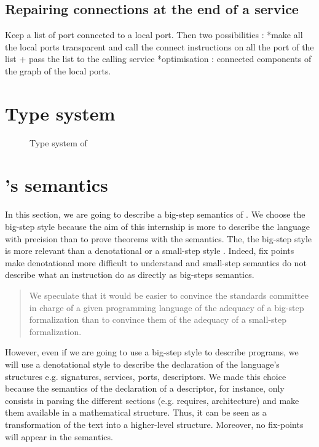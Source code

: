 \section{Repairing connections at the end of a service}
Keep a list of port connected to a local port. Then two possibilities : 
*make all the local ports transparent and call the connect instructions on all the port of the list + pass the list to the calling service
*optimisation : connected components of the graph of the local ports.




\chapter{Type system}


\begin{figure}[ht!]
\caption{Type system of \compo{}}


\label{fig:type_syst}
\end{figure}









\chapter{\compo's semantics}
In this section, we are going to describe a big-step semantics of \compo{}. We choose the big-step style because the aim of this internship is more to describe the language with precision than to prove theorems with the semantics. The, the big-step style is more relevant than a denotational or a small-step style \cite{Cha13}. Indeed, fix points make denotational more difficult to understand and small-step semantics do not describe what an instruction do as directly as big-steps semantics.

\blockquote{We speculate that it would be easier to convince the standards committee in charge of a given programming language of the adequacy of a big-step formalization than to convince them of the adequacy of a small-step formalization.}{\cite{Cha13}}

However, even if we are going to use a big-step style to describe programs, we will use a denotational style to describe the declaration of the language's structures e.g. signatures, services, ports, descriptors. We made this choice because the semantics of the declaration of a descriptor, for instance, only consists in parsing the different sections (e.g. requires, architecture) and make them available in a mathematical structure. Thus, it can be seen as a transformation of the text into a higher-level structure. Moreover, no fix-points will appear in the semantics.



